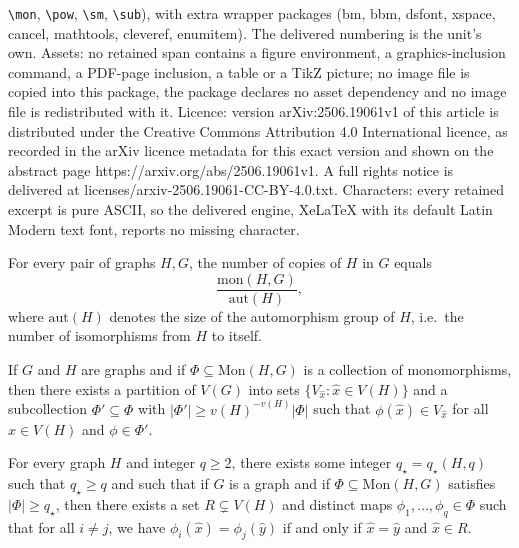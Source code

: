 \documentclass[10pt,a4paper]{amsart}
\newcommand{\Pow}{{q_\star}} %
\newcommand{\mon}{\mathrm{mon}}
\newcommand{\pow}{q} %
\newcommand{\sub}{\subseteq}
\begin{document}
\texttt{\textbackslash mon}, \texttt{\textbackslash pow}, \texttt{\textbackslash sm}, \texttt{\textbackslash sub}), with extra wrapper packages (bm, bbm, dsfont, xspace, cancel, mathtools, cleveref, enumitem). The delivered numbering is the unit's own. Assets: no retained span contains a figure environment, a graphics-inclusion command, a PDF-page inclusion, a table or a TikZ picture; no image file is copied into this package, the package declares no asset dependency and no image file is redistributed with it. Licence: version arXiv:2506.19061v1 of this article is distributed under the Creative Commons Attribution 4.0 International licence, as recorded in the arXiv licence metadata for this exact version and shown on the abstract page https://arxiv.org/abs/2506.19061v1. A full rights notice is delivered at licenses/arxiv-2506.19061-CC-BY-4.0.txt. Characters: every retained excerpt is pure ASCII, so the delivered engine, XeLaTeX with its default Latin Modern text font, reports no missing character.
	\begin{observation}\label{observation monomorphisms same as copies}
		For every pair of graphs $H,G$, the number of copies of $H$ in $G$ equals
		\[\frac{\mon(H,G)}{\mathrm{aut}(H)},\]
		where $\mathrm{aut}(H)$ denotes the size of the automorphism group of $H$, i.e.\ the number of isomorphisms from $H$ to itself.
	\end{observation}

	\begin{lemma}\label{lemma:canonicalReduction}
		If $G$ and $H$ are graphs and if $\Phi\subseteq \mathrm{Mon}(H,G)$ is a collection of monomorphisms, then there exists a partition of $V(G)$ into sets $\{V_{\hat{x}}:\hat{x}\in V(H)\}$ and a subcollection $\Phi'\sub \Phi$ with $|\Phi'|\ge v(H)^{-v(H)}|\Phi|$ such that $\phi(\hat{x})\in V_{\hat{x}}$ for all $\hat{x}\in V(H)$ and $\phi\in \Phi'$.
	\end{lemma}

	\begin{lemma}\label{lemma:sunflower}
		For every graph $H$ and integer $\pow \ge 2$, there exists some integer $\Pow=\Pow(H,q)$ such that $\Pow\ge \pow$ and such that if $G$ is a graph and if $\Phi\subseteq \mathrm{Mon}(H,G)$ satisfies $|\Phi|\ge \Pow$, then there exists a set $R\subsetneq V(H)$ and distinct maps $\phi_1,\ldots,\phi_\pow\in \Phi$ such that for all $i\ne j$, we have $\phi_i(\hat{x})=\phi_j(\hat{y})$ if and only if $\hat{x}=\hat{y}$ and $\hat{x}\in R$.
	\end{lemma}
\end{document}
